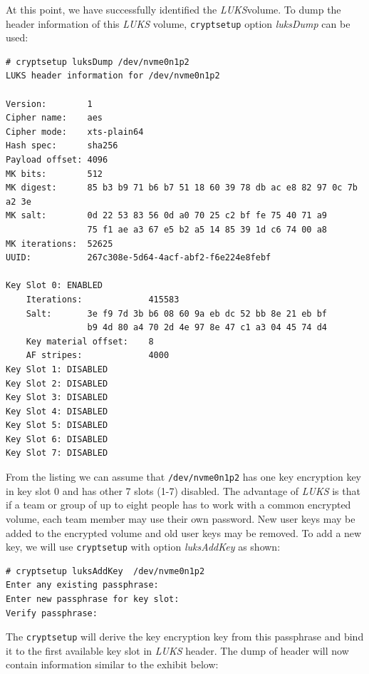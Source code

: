At this point, we have successfully identified the {\it LUKS}volume.
To dump the header information of this {\it LUKS} volume, {\tt cryptsetup} option {\it luksDump} can be used:
\begin{lstlisting}[columns=fixed,basicstyle=\ttfamily\footnotesize,tabsize=4,backgroundcolor=\color{yellow!10}]
# cryptsetup luksDump /dev/nvme0n1p2
LUKS header information for /dev/nvme0n1p2

Version:		1
Cipher name:	aes
Cipher mode:	xts-plain64
Hash spec:		sha256
Payload offset:	4096
MK bits:		512
MK digest:		85 b3 b9 71 b6 b7 51 18 60 39 78 db ac e8 82 97 0c 7b a2 3e
MK salt:		0d 22 53 83 56 0d a0 70 25 c2 bf fe 75 40 71 a9
				75 f1 ae a3 67 e5 b2 a5 14 85 39 1d c6 74 00 a8
MK iterations: 	52625
UUID:          	267c308e-5d64-4acf-abf2-f6e224e8febf

Key Slot 0: ENABLED
	Iterations:				415583
	Salt:		3e f9 7d 3b b6 08 60 9a eb dc 52 bb 8e 21 eb bf
				b9 4d 80 a4 70 2d 4e 97 8e 47 c1 a3 04 45 74 d4
	Key material offset:	8
	AF stripes:				4000
Key Slot 1: DISABLED
Key Slot 2: DISABLED
Key Slot 3: DISABLED
Key Slot 4: DISABLED
Key Slot 5: DISABLED
Key Slot 6: DISABLED
Key Slot 7: DISABLED
\end{lstlisting}
From the listing we can assume that {\tt /dev/nvme0n1p2} has one key encryption key in key slot 0 and has other 7 slots (1-7) disabled.
The advantage of {\it LUKS} is that if a team or group of up to eight people has to work with a common encrypted volume, each team member may use their own password.
New user keys may be added to the encrypted volume and old user keys may be removed.
To add a new key, we will use {\tt cryptsetup} with option {\it luksAddKey} as shown:
\begin{lstlisting}[columns=fixed,basicstyle=\ttfamily\footnotesize,tabsize=4,backgroundcolor=\color{yellow!10}]
# cryptsetup luksAddKey  /dev/nvme0n1p2
Enter any existing passphrase:
Enter new passphrase for key slot:
Verify passphrase:
\end{lstlisting}
The {\tt cryptsetup} will derive the key encryption key from this passphrase and bind it to the first available key slot in {\it LUKS} header.
The dump of header will now contain information similar to the exhibit below:

